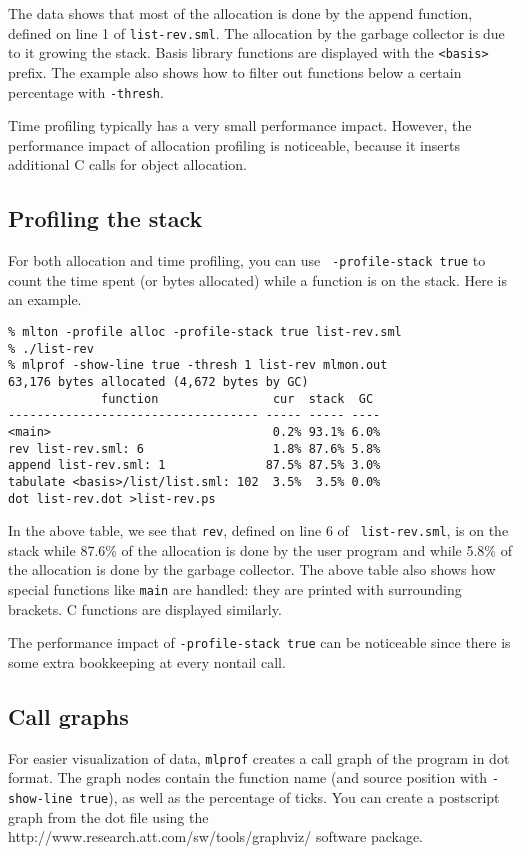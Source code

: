 The data shows that most of the allocation is done by the append
function, defined on line 1 of {\tt list-rev.sml}.  The allocation by
the garbage collector is due to it growing the stack.  Basis library
functions are displayed with the {\tt <basis>} prefix.  The example
also shows how to filter out functions below a certain percentage with
{\tt -thresh}.

Time profiling typically has a very small performance impact.
However, the performance impact of allocation profiling is noticeable,
because it inserts additional C calls for object allocation.

\subsection{Profiling the stack}

For both allocation and time profiling, you can use {\tt
-profile-stack true} to count the time spent (or bytes allocated)
while a function is on the stack.  Here is an example.

\begin{verbatim}
% mlton -profile alloc -profile-stack true list-rev.sml
% ./list-rev
% mlprof -show-line true -thresh 1 list-rev mlmon.out
63,176 bytes allocated (4,672 bytes by GC)
             function                cur  stack  GC 
----------------------------------- ----- ----- ----
<main>                               0.2% 93.1% 6.0%
rev list-rev.sml: 6                  1.8% 87.6% 5.8%
append list-rev.sml: 1              87.5% 87.5% 3.0%
tabulate <basis>/list/list.sml: 102  3.5%  3.5% 0.0%
dot list-rev.dot >list-rev.ps
\end{verbatim}

In the above table, we see that {\tt rev}, defined on line 6 of {\tt
list-rev.sml}, is on the stack while 87.6\% of the allocation is done
by the user program and while 5.8\% of the allocation is done by the
garbage collector.  The above table also shows how special functions
like {\tt main} are handled: they are printed with surrounding
brackets.  C functions are displayed similarly.

The performance impact of {\tt -profile-stack true} can be noticeable
since there is some extra bookkeeping at every nontail call.

\subsection{Call graphs}

For easier visualization of data, {\tt mlprof} creates a call graph of
the program in dot format.  The graph nodes contain the function name
(and source position with {\tt -show-line true}), as well as the
percentage of ticks.  You can create a postscript graph from the dot
file using the
		  {http://www.research.att.com/sw/tools/graphviz/}
software package.

